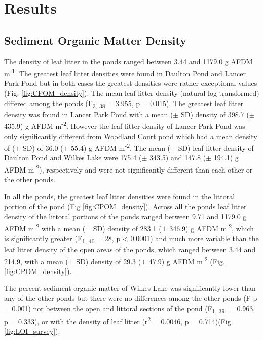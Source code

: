 \section{Results}
\subsection{Sediment Organic Matter Density}

The density of leaf litter in the ponds ranged between 3.44 and 1179.0 g AFDM m\textsuperscript{-1}. The greatest leaf litter densities were found in Daulton Pond and Lancer Park Pond but in both cases the greatest densities were rather exceptional values (Fig. \ref{fig:CPOM_density}). The mean leaf litter density (natural log transformed) differed among the ponds (F\textsubscript{3, 38} = 3.955, p = 0.015). The greatest leaf litter density was found in Lancer Park Pond with a mean ($\pm$ SD) density of 398.7 ($\pm$ 435.9) g AFDM m\textsuperscript{-2}. However the leaf litter density of Lancer Park Pond was only significantly different from Woodland Court pond which had a mean density of ($\pm$ SD) of 36.0 ($\pm$ 55.4) g AFDM m\textsuperscript{-2}. The mean ($\pm$ SD) leaf litter density of Daulton Pond and Wilkes Lake were 175.4 ($\pm$ 343.5) and 147.8 ($\pm$ 194.1) g AFDM m\textsuperscript{-2}), respectively and were not significantly different than each other or the other ponds. 

In all the ponds, the greatest leaf litter densities were found in the littoral portion of the pond (Fig \ref{fig:CPOM_density}). Across all the ponds leaf litter density of the littoral portions of the ponds ranged between 9.71 and 1179.0 g AFDM m\textsuperscript{-2} with a mean ($\pm$ SD) density of 283.1 ($\pm$ 346.9) g AFDM m\textsuperscript{-2}, which is significantly greater (F\textsubscript{1, 40} = 28, p < 0.0001) and much more variable than the leaf litter density of the open areas of the ponds, which ranged between 3.44 and 214.9, with a mean ($\pm$ SD) density of 29.3 ($\pm$ 47.9) g AFDM m\textsuperscript{-2} (Fig. \ref{fig:CPOM_density}). 

The percent sediment organic matter of Wilkes Lake was significantly lower than any of the other ponds but there were no differences among the other ponds (F p = 0.001) nor between the open and littoral sections of the pond (F\textsubscript{1, 39}, = 0.963, p = 0.333), or with the density of leaf litter (r\textsuperscript{2} = 0.0046, p = 0.714)(Fig. \ref{fig:LOI_survey}). 

  

  

